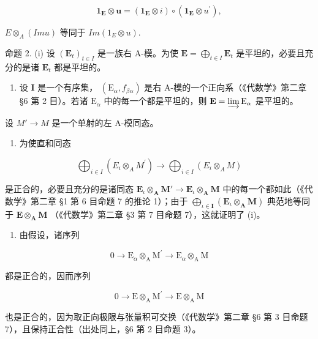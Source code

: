 \[
\mathbf {1} _ {\mathbf {E}} \otimes \boldsymbol {u} = (\mathbf {1} _ {\mathbf {E}} \otimes i) \circ (\mathbf {1} _ {\mathbf {E}} \otimes u ^ {\prime}),
\]

\(E \otimes_{A} (Im u) \text{ 等同于 } Im(1_{E} \otimes u).\)

命题 2. (i) 设 \((\mathbf{E}_t)_{t \in I}\) 是一族右 A-模。为使 \(\mathbf{E} = \bigoplus_{t \in I} \mathbf{E}_t\) 是平坦的，必要且充分的是诸 \(\mathbf{E}_t\) 都是平坦的。

\begin{enumerate}
\def\labelenumi{(\roman{enumi})}
\setcounter{enumi}{1}
\tightlist
\item
  设 \(\mathbf{I}\) 是一个有序集， \((\mathrm{E}_{\alpha}, f_{\beta \alpha})\) 是右 A-模的一个正向系（《代数学》第二章 §6 第 2 目）。若诸 \(\mathrm{E}_{\alpha}\) 中的每一个都是平坦的，则 \(\mathbf{E} = \varinjlim \mathrm{E}_{\alpha}\) 是平坦的。
\end{enumerate}

设 \(M' \to M\) 是一个单射的左 A-模同态。

\begin{enumerate}
\def\labelenumi{(\roman{enumi})}
\tightlist
\item
  为使直和同态
\end{enumerate}

\[
\bigoplus_ {i \in I} \left(E _ {i} \otimes_ {A} M ^ {\prime}\right)\rightarrow \bigoplus_ {i \in I} \left(E _ {i} \otimes_ {A} M\right)
\]

是正合的，必要且充分的是诸同态 \(\mathbf{E}_{\iota} \otimes_{\mathbf{A}} \mathbf{M}' \to \mathbf{E}_{\iota} \otimes_{\mathbf{A}} \mathbf{M}\) 中的每一个都如此（《代数学》第二章 §1 第 6 目命题 7 的推论 1）；由于 \(\bigoplus_{\iota \in \mathbf{I}} (\mathbf{E}_{\iota} \otimes_{\mathbf{A}} \mathbf{M})\) 典范地等同于 \(\mathbf{E} \otimes_{\mathbf{A}} \mathbf{M}\) （《代数学》第二章 §3 第 7 目命题 7），这就证明了 (i)。

\begin{enumerate}
\def\labelenumi{(\roman{enumi})}
\setcounter{enumi}{1}
\tightlist
\item
  由假设，诸序列
\end{enumerate}

\[
0 \rightarrow \mathrm{E} _ {\alpha} \otimes_ {\mathrm{A}} \mathrm{M} ^ {\prime} \rightarrow \mathrm{E} _ {\alpha} \otimes_ {\mathrm{A}} \mathrm{M}
\]

都是正合的，因而序列

\[
0 \rightarrow \mathrm{E} \otimes_ {\mathrm{A}} \mathrm{M} ^ {\prime} \rightarrow \mathrm{E} \otimes_ {\mathrm{A}} \mathrm{M}
\]

也是正合的，因为取正向极限与张量积可交换（《代数学》第二章 §6 第 3 目命题 7），且保持正合性（出处同上，§6 第 2 目命题 3）。

